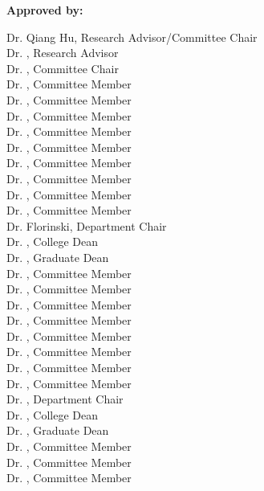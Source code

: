 \begin{titlepage}
\begin{center}
    \end{center}
    

\vfill

\textbf{Approved by:}


\vspace{.1cm}

\ifdefined\reschair
\noindent
Dr. Qiang Hu, Research Advisor/Committee Chair\\
\else
\noindent
Dr. \resadv, Research Advisor \\
Dr. \comchair, Committee Chair\\
\fi
\ifdefined\commemi
\noindent
Dr. \commema, Committee Member\\
Dr. \commemb, Committee Member\\
Dr. \commemc, Committee Member\\
Dr. \commemd, Committee Member\\
Dr. \commeme, Committee Member\\
Dr. \commemf, Committee Member\\
Dr. \commemg, Committee Member\\
Dr. \commemh, Committee Member\\
Dr. \commemi, Committee Member\\
Dr. \depchair Florinski, Department Chair\\
Dr. \colldean, College Dean\\
Dr. \graddean, Graduate Dean\\
\else
\ifdefined\commemh
\noindent
Dr. \commema, Committee Member\\
Dr. \commemb, Committee Member\\
Dr. \commemc, Committee Member\\
Dr. \commemd, Committee Member\\
Dr. \commeme, Committee Member\\
Dr. \commemf, Committee Member\\
Dr. \commemg, Committee Member\\
Dr. \commemh, Committee Member\\
Dr. \depchair, Department Chair\\
Dr. \colldean, College Dean\\
Dr. \graddean, Graduate Dean\\
\else
\ifdefined\commemg
\noindent
Dr. \commema, Committee Member\\
Dr. \commemb, Committee Member\\
Dr. \commemc, Committee Member\\

\end{titlepage}
